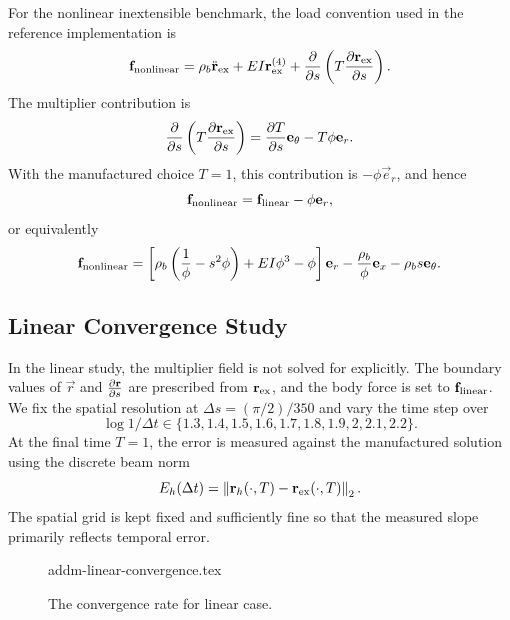 For the nonlinear inextensible benchmark, the load convention used in the
reference implementation is
\begin{equation*}
    \vec f_{\rm nonlinear}
    =
    \rho_b\ddot{\vec r}_{\rm ex}
    + EI\vec r_{\rm ex}^{(4)}
    + \pdv*{\left(T \pdv{\vec r_{\rm ex}}{s}\right)}{s}.
\end{equation*}
The multiplier contribution is
\begin{equation*}
    \pdv*{\left(T \pdv{\vec r_{\rm ex}}{s}\right)}{s}
    =
    \pdv{T}{s}\vec e_\theta - T\phi\vec e_r.
\end{equation*}
With the manufactured choice \(T=1\), this contribution is
\(-\phi\vec e_r\), and hence
\begin{equation*}
    \vec f_{\rm nonlinear}
    =
    \vec f_{\rm linear} - \phi\vec e_r,
\end{equation*}
or equivalently
\begin{equation*}
    \vec f_{\rm nonlinear}
    =
    \left[\rho_b\left(\frac1\phi - s^2\phi\right)+EI\phi^3-\phi\right]\vec e_r
    - \frac{\rho_b}{\phi}\vec e_x
    - \rho_b s\vec e_\theta.
\end{equation*}

\subsection{Linear Convergence Study}
In the linear study, the multiplier field is not solved for explicitly. The
boundary values of \(\vec r\) and \(\pdv{\vec r}{s}\) are prescribed from
\(\vec r_{\rm ex}\), and the body force is set to \(\vec f_{\rm linear}\). We
fix the spatial resolution at \(\Delta s=(\pi/2)/350\) and vary the time step
over
\begin{equation*}
    \log{1/\Delta t} \in \{1.3,1.4,1.5,1.6,1.7,1.8,1.9,2,2.1,2.2\}.
\end{equation*}
At the final time \(T=1\), the error is measured against the manufactured
solution using the discrete beam norm
\begin{equation*}
    E_h(\Delta t) = \norm{\vec r_h(\cdot,T) - \vec r_{\rm ex}(\cdot,T)}_2.
\end{equation*}
The spatial grid is kept fixed and sufficiently fine so that the measured slope
primarily reflects temporal error.

\begin{figure}[H]
    \centering
    {addm-linear-convergence.tex}
    \caption{The convergence rate for linear case.}
    \label{fig:newmark-addm-linear-convergence}
\end{figure}

